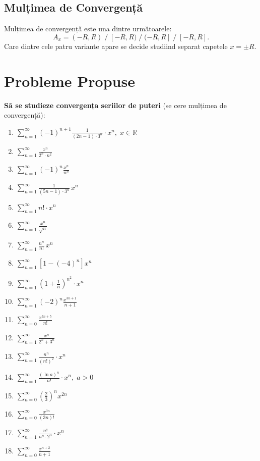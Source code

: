 \documentclass[12pt, a4paper]{report}
\begin{document}
	\section{Mulțimea de Convergență}
	
	Mulțimea de convergență este una dintre următoarele:
	\[
	A_x = (-R, R) \; / \; [-R, R) \; / \; (-R, R] \; / \; [-R, R].
	\]
	Care dintre cele patru variante apare se decide studiind separat capetele $x = \pm R$.
	
	
	\chapter{Probleme Propuse}
	
	\textbf{Să se studieze convergența seriilor de puteri} (se cere mulțimea de convergență):
	
	\begin{enumerate}[label=\textbf{\arabic*.}]
		\item $\displaystyle \sum_{n=1}^{\infty} (-1)^{n+1} \frac{1}{(2n-1) \cdot 3^n} \cdot x^n, \; x \in \mathbb{R}$
		\item $\displaystyle \sum_{n=1}^{\infty} \frac{x^n}{2^n \cdot n^2}$
		\item $\displaystyle \sum_{n=1}^{\infty} (-1)^n \frac{x^n}{n^n}$
		\item $\displaystyle \sum_{n=1}^{\infty} \frac{1}{(5n-1) \cdot 3^n} \, x^n$
		\item $\displaystyle \sum_{n=1}^{\infty} n! \cdot x^n$
		\item $\displaystyle \sum_{n=1}^{\infty} \frac{x^n}{\sqrt{n}}$
		\item $\displaystyle \sum_{n=1}^{\infty} \frac{n^n}{n!} \, x^n$
		\item $\displaystyle \sum_{n=1}^{\infty} \left[1 - (-4)^n\right] x^n$
		\item $\displaystyle \sum_{n=1}^{\infty} \left(1 + \frac{1}{n}\right)^{n^2} \cdot x^n$
		\item $\displaystyle \sum_{n=1}^{\infty} (-2)^n \frac{x^{3n+1}}{n+1}$
		\item $\displaystyle \sum_{n=0}^{\infty} \frac{x^{3n+5}}{n!}$
		\item $\displaystyle \sum_{n=1}^{\infty} \frac{x^n}{2^n + 3^n}$
		\item $\displaystyle \sum_{n=1}^{\infty} \frac{n^n}{(n!)^2} \cdot x^n$
		\item $\displaystyle \sum_{n=1}^{\infty} \frac{(\ln a)^n}{n!} \cdot x^n, \; a > 0$
		\item $\displaystyle \sum_{n=0}^{\infty} \left(\frac{2}{3}\right)^n x^{2n}$
		\item $\displaystyle \sum_{n=0}^{\infty} \frac{x^{3n}}{(3n)!}$
		\item $\displaystyle \sum_{n=1}^{\infty} \frac{n!}{n^n \cdot 2^n} \cdot x^n$
		\item $\displaystyle \sum_{n=0}^{\infty} \frac{x^{n+2}}{n+1}$
	\end{enumerate}
	
\end{document}
